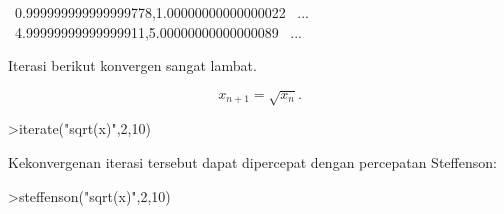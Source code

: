 \documentclass[a4paper,11pt,oneside,enabledeprecatedfontcommands]{scrbook}
\newenvironment{eulernotebook}{}{}
\newenvironment{eulercomment}{\par\medskip\noindent}{\par\medskip}
\newenvironment{eulerformula}{}{}
\begin{document}
\begin{eulernotebook}
\begin{euleroutput}
  ~0.999999999999999778,1.00000000000000022~     ...
  ~4.99999999999999911,5.00000000000000089~     ...
\end{euleroutput}
\begin{eulercomment}
Iterasi berikut konvergen sangat lambat.
\end{eulercomment}
\begin{eulerformula}
\[
x_{n+1} = \sqrt{x_n}.
\]
\end{eulerformula}
\begin{eulerprompt}
>iterate("sqrt(x)",2,10)
\end{eulerprompt}
\begin{euleroutput}
  [2,  1.41421,  1.18921,  1.09051,  1.04427,  1.0219,  1.01089,  1.00543,  1.00271,  1.00135,  1.00068]
\end{euleroutput}
\begin{eulercomment}
Kekonvergenan iterasi tersebut dapat dipercepat dengan percepatan Steffenson:
\end{eulercomment}
\begin{eulerprompt}
>steffenson("sqrt(x)",2,10)
\end{eulerprompt}
\begin{euleroutput}
  [1.04888,  1.00028,  1,  1]
\end{euleroutput}


\end{eulernotebook}
\end{document}
